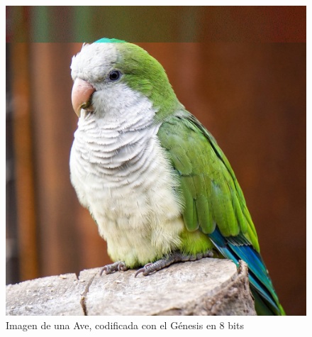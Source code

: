 \documentclass[conference]{IEEEtran}
\begin{document}
    \begin{figure}[H]
    \centering
    \includegraphics[width=0.9\linewidth]{image/birb8.png}
\caption{Imagen de una Ave, codificada con el Génesis en 8 bits}
\end{figure}
\end{document}
